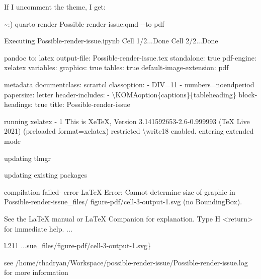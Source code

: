 \documentclass[
  letterpaper,
  DIV=11,
  numbers=noendperiod]{scrartcl}
\newenvironment{Shaded}{\begin{snugshade}}{\end{snugshade}}
\newcommand{\NormalTok}[1]{\textcolor[rgb]{0.00,0.23,0.31}{#1}}
\begin{document}
If I uncomment the theme, I get:

\begin{Shaded}
\begin{Highlighting}[]
\NormalTok{\textasciitilde{}:) quarto render Possible{-}render{-}issue.qmd {-}{-}to pdf}

\NormalTok{Executing \textquotesingle{}Possible{-}render{-}issue.ipynb\textquotesingle{}}
\NormalTok{  Cell 1/2...Done}
\NormalTok{  Cell 2/2...Done}

\NormalTok{pandoc }
\NormalTok{  to: latex}
\NormalTok{  output{-}file: Possible{-}render{-}issue.tex}
\NormalTok{  standalone: true}
\NormalTok{  pdf{-}engine: xelatex}
\NormalTok{  variables:}
\NormalTok{    graphics: true}
\NormalTok{    tables: true}
\NormalTok{  default{-}image{-}extension: pdf}
  
\NormalTok{metadata}
\NormalTok{  documentclass: scrartcl}
\NormalTok{  classoption:}
\NormalTok{    {-} DIV=11}
\NormalTok{    {-} numbers=noendperiod}
\NormalTok{  papersize: letter}
\NormalTok{  header{-}includes:}
\NormalTok{    {-} \textquotesingle{}\textbackslash{}KOMAoption\{captions\}\{tableheading\}\textquotesingle{}}
\NormalTok{  block{-}headings: true}
\NormalTok{  title: Possible{-}render{-}issue}
  
\NormalTok{running xelatex {-} 1}
\NormalTok{  This is XeTeX, Version 3.141592653{-}2.6{-}0.999993 (TeX Live 2021) (preloaded format=xelatex)}
\NormalTok{   restricted \textbackslash{}write18 enabled.}
\NormalTok{  entering extended mode}
  
\NormalTok{updating tlmgr}

\NormalTok{updating existing packages}

\NormalTok{compilation failed{-} error}
\NormalTok{LaTeX Error: Cannot determine size of graphic in Possible{-}render{-}issue\_files/}
\NormalTok{figure{-}pdf/cell{-}3{-}output{-}1.svg (no BoundingBox).}

\NormalTok{See the LaTeX manual or LaTeX Companion for explanation.}
\NormalTok{Type  H \textless{}return\textgreater{}  for immediate help.}
\NormalTok{ ...                                              }
                                                  
\NormalTok{l.211 ...sue\_files/figure{-}pdf/cell{-}3{-}output{-}1.svg\}}
                                                   

\NormalTok{see /home/thadryan/Workspace/possible{-}render{-}issue/Possible{-}render{-}issue.log for more information}
\end{Highlighting}
\end{Shaded}
\end{document}
